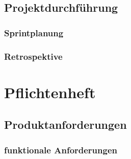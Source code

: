 \documentclass[a4paper, 11pt]{scrreprt}
\begin{document}
\section{Projektdurchführung}

\subsection{Sprintplanung}

\subsection{Retrospektive}

\chapter{Pflichtenheft}

\section{Produktanforderungen}

\subsection{funktionale Anforderungen}
\end{document}
